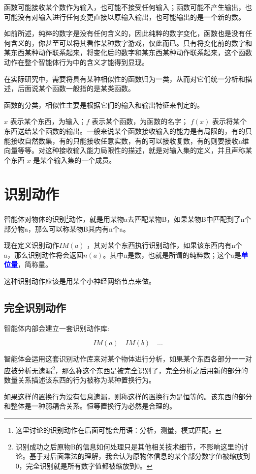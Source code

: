 \documentclass[12pt,oneside]{book}
\renewcommand{\emph}[1]{\textcolor{blue}{\textbf{#1}}}
\begin{document}
函数可能接收某个数作为输入，也可能不接受任何输入；函数可能不产生输出，也可能没有对输入进行任何变更直接以原输入输出，也可能输出的是一个新的数。

如前所述，纯粹的数字是没有任何含义的，因此纯粹的数字变化，函数也是没有任何含义的，你甚至可以将其看作某种数字游戏，仅此而已。只有将变化前的数字和某东西某种动作联系起来，将变化后的数字和某东西某种动作联系起来，这个函数动作在整个智能体行为中的含义才能得到显现。

在实际研究中，需要将具有某种相似性的函数归为一类，从而对它们统一分析和描述，后面说某个函数一般指的是某类函数。

函数的分类，相似性主要是根据它们的输入和输出特征来判定的。

$x$ 表示某个东西，为输入；$f$ 表示某个函数，为函数的名字； $f(x)$ 表示将某个东西送给某个函数的输出。一般来说某个函数接收输入的能力是有局限的，有的只能接收自然数集，有的只能接收任意实数，有的可以接收复数，有的则要接收n维向量等等。对这种接收输入能力局限性的描述，就是对输入集的定义，并且声称某个东西 $x$ 是某个输入集的一个成员。


\section{识别动作}
智能体对物体的识别\footnote{这里讨论的识别动作在后面可能会用语：分析，测量，模式匹配。}动作，就是用某物a去匹配某物B，如果某物B中匹配到了n个部分物a，那么可以称某物B其内有n个a。

现在定义识别动作$IM(a)$ ，其对某个东西执行识别动作，如果该东西内有n个a，那么识别动作将会返回$n(a)$。其中n是数，也就是所谓的纯粹数；这个a是\emph{单位量}，简称量。

这种识别动作应该是用某个小神经网络节点来做。

\subsection{完全识别动作}
智能体内部会建立一套识别动作库: 

\[
IM(a) \quad IM(b) \quad ...
\]

智能体会运用这套识别动作库来对某个物体进行分析，如果某个东西各部分一一对应被分析无遗漏\footnote{识别成功之后原物B的信息如何处理只是其他相关技术细节，不影响这里的讨论。基于对后面乘法的理解，我会认为原物体信息的某个部分数字值被缩放到0，完全识别就是所有数字值都被缩放到0。}，那么称这个东西是被完全识别了，完全分析之后用新的部分的数量关系描述该东西的行为被称为某种置换行为。

如果这样的置换行为没有信息遗漏，则称这样的置换行为是恒等的。该东西的部分和整体是一种弱耦合关系。恒等置换行为必然是合理的。
\end{document}
